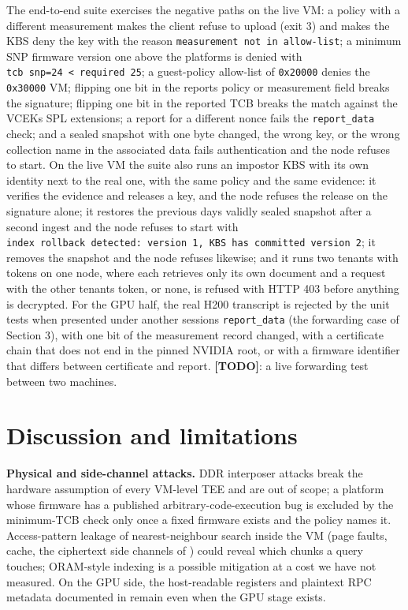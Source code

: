 \documentclass[letterpaper,twocolumn,10pt]{article}
\begin{document}
The end-to-end suite exercises the negative paths on the live VM: a policy with a different measurement makes the client refuse to upload (exit 3) and makes the KBS deny the key with the reason \texttt{measurement\ not\ in\ allow-list}; a minimum SNP firmware version one above the platform\textquotesingle s is denied with \texttt{tcb\ \textquotesingle{}snp\textquotesingle{}=24\ \textless{}\ required\ 25}; a guest-policy allow-list of \texttt{0x20000} denies the \texttt{0x30000} VM; flipping one bit in the report\textquotesingle s policy or measurement field breaks the signature; flipping one bit in the reported TCB breaks the match against the VCEK\textquotesingle s SPL extensions; a report for a different nonce fails the \texttt{report\_data} check; and a sealed snapshot with one byte changed, the wrong key, or the wrong collection name in the associated data fails authentication and the node refuses to start. On the live VM the suite also runs an impostor KBS with its own identity next to the real one, with the same policy and the same evidence: it verifies the evidence and releases a key, and the node refuses the release on the signature alone; it restores the previous day\textquotesingle s validly sealed snapshot after a second ingest and the node refuses to start with \texttt{index\ rollback\ detected:\ version\ 1,\ KBS\ has\ committed\ version\ 2}; it removes the snapshot and the node refuses likewise; and it runs two tenants with tokens on one node, where each retrieves only its own document and a request with the other tenant\textquotesingle s token, or none, is refused with HTTP 403 before anything is decrypted. For the GPU half, the real H200 transcript is rejected by the unit tests when presented under another session\textquotesingle s \texttt{report\_data} (the forwarding case of Section 3), with one bit of the measurement record changed, with a certificate chain that does not end in the pinned NVIDIA root, or with a firmware identifier that differs between certificate and report. \textbf{{[}TODO{]}}: a live forwarding test between two machines.

\section{Discussion and limitations}\label{discussion-and-limitations}

\textbf{Physical and side-channel attacks.} DDR interposer attacks \cite{chuang2025teefail,demeulemeester2026batteringram} break the hardware assumption of every VM-level TEE and are out of scope; a platform whose firmware has a published arbitrary-code-execution bug \cite{shen2026aspbreaker} is excluded by the minimum-TCB check only once a fixed firmware exists and the policy names it. Access-pattern leakage of nearest-neighbour search inside the VM (page faults, cache, the ciphertext side channels of \cite{schlueter2025heracles}) could reveal which chunks a query touches; ORAM-style indexing is a possible mitigation at a cost we have not measured. On the GPU side, the host-readable registers and plaintext RPC metadata documented in \cite{gu2025nvidiacc} remain even when the GPU stage exists.
\end{document}
